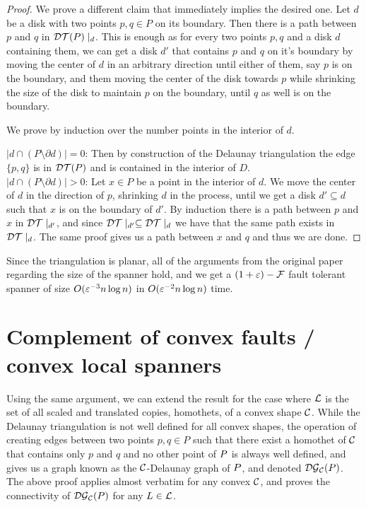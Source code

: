\documentclass[12pt]{article}%
\begin{document}
\begin{proof}
    We prove a different claim that immediately implies the desired
    one. Let $d$ be a disk with two points $p,q\in P$ on its
    boundary. Then there is a path between $p$ and $q$ in
    $\mathcal{DT}(P)\mid_d$. This is enough as for every two points $p,q$ and a
    disk $d$ containing them, we can get a disk $d'$ that contains $p$
    and $q$ on it's boundary by moving the center of $d$ in an
    arbitrary direction until either of them, say $p$ is on the
    boundary, and them moving the center of the disk towards $p$ while
    shrinking the size of the disk to maintain $p$ on the boundary,
    until $q$ as well is on the boundary.
    
    We prove by induction over the number points in the interior of
    $d$.
    
    $|d\cap (P\setminus \partial d)| = 0$: Then by construction of the Delaunay triangulation the edge $\{p,q\}$ is in $\mathcal{DT}(P)$ and is contained in the interior of $D$.\\
    
    $|d\cap (P\setminus \partial d)| > 0$: Let $x\in P$ be a point in
    the interior of $d$. We move the center of $d$ in the direction of
    $p$, shrinking $d$ in the process, until we get a disk
    $d'\subseteq d$ such that $x$ is on the boundary of $d'$. By
    induction there is a path between $p$ and $x$ in $\mathcal{DT}\mid_{d'}$,
    and since $\mathcal{DT}\mid_{d'}\subseteq \mathcal{DT}\mid_{d}$ we have that the
    same path exists in $\mathcal{DT}\mid_{d}$. The same proof gives us a path
    between $x$ and $q$ and thus we are done.
    
\end{proof}

Since the triangulation is planar, all of the arguments from the
original paper regarding the size of the spanner hold, and we get a
$(1+\varepsilon)-\mathcal{F}$ fault tolerant spanner of size $O(\varepsilon^{-3}n\log n)$ in
$O(\varepsilon^{-2}n\log n)$ time.

\section{Complement of convex faults / convex local spanners}
Using the same argument, we can extend the result for the case where
$\mathcal{L}$ is the set of all scaled and translated copies, homothets, of a
convex shape $\mathcal{C}$. While the Delaunay triangulation is not well
defined for all convex shapes, the operation of creating edges between
two points $p,q\in P$ such that there exist a homothet of $\mathcal{C}$ that
contains only $p$ and $q$ and no other point of $P$ is always well
defined, and gives us a graph known as the $\mathcal{C}$-Delaunay graph of
$P$, and denoted $\mathcal{DG}_{\mathcal{C}}(P)$. The above proof applies almost
verbatim for any convex $\mathcal{C}$, and proves the connectivity of
$\mathcal{DG}_{\mathcal{C}}(P)$ for any $L\in \mathcal{L}$.
\end{document}
